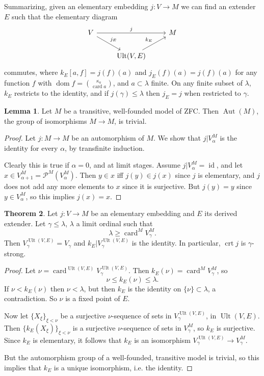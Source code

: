 \documentclass[12pt]{report}
\newcommand{\Aut}{\operatorname{Aut}}
\newcommand{\card}{\operatorname{card}}
\newcommand{\id}{\operatorname{id}}
\newcommand{\pset}{\mathcal{P}}
\DeclareMathOperator{\crt}{crt}
\DeclareMathOperator{\dom}{dom}
\DeclareMathOperator{\Ult}{Ult}
\theoremstyle{definition}
\newtheorem{theorem}{Theorem}[chapter]
\newtheorem{lemma}[theorem]{Lemma}
\begin{document}
Summarizing, given an elementary embedding $j: V \to M$ we can find an extender $E$ such that the elementary diagram
$$\begin{tikzcd}
V \arrow[rr,"j"] \arrow[dr,"j_E"] && M\\
& \Ult(V, E) \arrow[ur,"k_E"]
\end{tikzcd}$$
commutes, where $k_E[a, f] = j(f)(a)$ and $j_E(f)(a) = j(f)(a)$ for any function $f$ with $\dom f = \binom{\kappa_a}{\card a}$, and $a \subset \lambda$ finite.
On any finite subset of $\lambda$, $k_E$ restricts to the identity, and if $j(\gamma) \leq \lambda$ then $j_E = j$ when restricted to $\gamma$.

\begin{lemma}
Let $M$ be a transitive, well-founded model of ZFC. Then $\Aut(M)$, the group of isomorphisms $M \to M$, is trivial.
\end{lemma}
\begin{proof}
Let $j: M \to M$ be an automorphism of $M$. We show that $j|V_\alpha^M$ is the identity for every $\alpha$, by transfinite induction.

Clearly this is true if $\alpha = 0$, and at limit stages. Assume $j|V_\alpha^M = \id$, and let $x \in V_{\alpha+1}^M = \pset^M(V_\alpha^M)$.
Then $y \in x$ iff $j(y) \in j(x)$ since $j$ is elementary, and $j$ does not add any more elements to $x$ since it is surjective.
But $j(y) = y$ since $y \in V_\alpha^M$, so this implies $j(x) = x$.
\end{proof}

\begin{theorem}
Let $j: V \to M$ be an elementary embedding and $E$ its derived extender. Let $\gamma \leq \lambda$, $\lambda$ a limit ordinal such that
$$\lambda \geq \card^M V_\gamma^M.$$
Then $V_\gamma^{\Ult(V, E)} = V_\gamma$ and $k_E|V_\gamma^{\Ult(V, E)}$ is the identity.
In particular, $\crt j$ is $\gamma$-strong.
\end{theorem}
\begin{proof}
Let $\nu = \card^{\Ult(V, E)} V_\gamma^{\Ult(V, E)}$. Then $k_E(\nu) = \card^M V_\gamma^M$, so
$$\nu \leq k_E(\nu) \leq \lambda.$$
If $\nu < k_E(\nu)$ then $\nu < \lambda$, but then $k_E$ is the identity on $\{\nu\} \subset \lambda$, a contradiction.
So $\nu$ is a fixed point of $E$.

Now let $\{X_\xi\}_{\xi < \nu}$ be a surjective $\nu$-sequence of sets in $V_\gamma^{\Ult(V, E)}$, in $\Ult(V, E)$.
Then $\{k_E(X_\xi)\}_{\xi < \nu}$ is a surjective $\nu$-sequence of sets in $V_\gamma^M$, so $k_E$ is surjective.
Since $k_E$ is elementary, it follows that $k_E$ is an isomorphism $V_\gamma^{\Ult(V, E)} \to V_\gamma^M$.

But the automorphism group of a well-founded, transitive model is trivial, so this implies that $k_E$ is a unique isomorphism, i.e. the identity.
\end{proof}
\end{document}
